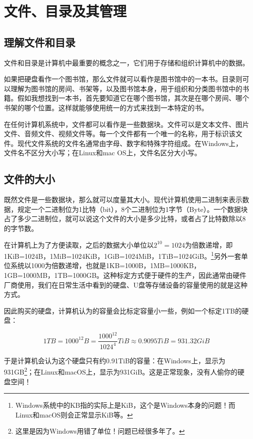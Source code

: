 \section{文件、目录及其管理}

\subsection{理解文件和目录}

文件和目录是计算机中最重要的概念之一，它们用于存储和组织计算机中的数据。

如果把硬盘看作一个图书馆，那么文件就可以看作是图书馆中的一本书。目录则可以理解为图书馆的房间、书架等，以及图书馆本身，用于组织和分类图书馆中的书籍。假如我想找到一本书，首先要知道它在哪个图书馆，其次是在哪个房间、哪个书架的哪个位置。这样就能够使用统一的方式来找到一本特定的书。

在任何计算机系统中，文件都可以看作是一些数据块。文件可以是文本文件、图片文件、音频文件、视频文件等。每一个文件都有一个唯一的名称，用于标识该文件。现代文件系统的文件名通常由字母、数字和特殊字符组成。在Windows上，文件名不区分大小写；在Linux和mac OS上，文件名区分大小写。

\subsection{文件的大小}

既然文件是一些数据块，那么就可以度量其大小。现代计算机使用二进制来表示数据，规定一个二进制位为1比特（bit），8个二进制位为1字节（Byte）。一个数据块占了多少二进制位，就可以说这个文件的大小是多少比特，或者占了比特数除以8的字节数。

在计算机上为了方便读取，之后的数据大小单位以$2^{10}=1024$为倍数递增，即1KiB=1024B，1MiB=1024KiB，1GiB=1024MiB，1TiB=1024GiB。\footnote{Windows系统中的KB指的实际上是KiB，这个是Windows本身的问题！而Linux和macOS则会正常显示KiB等。}另外一套单位系统以1000为倍数递增，也就是1KB=1000B，1MB=1000KB，1GB=1000MB，1TB=1000GB。这种标定方式便于硬件的生产，因此通常由硬件厂商使用，我们在日常生活中看到的硬盘、U盘等存储设备的容量使用的就是这种方式。

因此购买的硬盘，计算机认为的容量会比标定容量小一些，例如一个标定1TB的硬盘：
  
\[ 1TB = 1000^{12} B = \frac{1000^{12}}{1024^{4}} TiB \approx 0.9095 TiB = 931.32 GiB \]

于是计算机会认为这个硬盘只有约0.91TiB的容量：在Windows上，显示为931GB\footnote{这里是因为Windows用错了单位！问题已经很多年了。}；在Linux和macOS上，显示为931GiB。这是正常现象，没有人偷你的硬盘空间！

